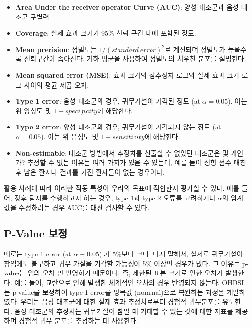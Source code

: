 \documentclass[10.5pt]{book}
\providecommand{\tightlist}{%
  \setlength{\itemsep}{0pt}\setlength{\parskip}{0pt}}
\theoremstyle{definition}
\theoremstyle{definition}
\theoremstyle{definition}
\theoremstyle{remark}
\begin{document}
\begin{itemize}
\tightlist
\item
  \textbf{Area Under the receiver operator Curve (AUC)}: 양성 대조군과
  음성 대조군 구별력.
\item
  \textbf{Coverage}: 실제 효과 크기가 95\% 신뢰 구간 내에 포함된 정도.
\item
  \textbf{Mean precision}: 정밀도는 \(1 / (standard \ error) ^ 2\)로
  계산되며 정밀도가 높을수록 신뢰구간이 좁아진다. 기하 평균을 사용하여
  정밀도의 치우친 분포를 설명한다.
\item
  \textbf{Mean squared error (MSE)}: 효과 크기의 점추정치 로그와 실제
  효과 크기 로그 사이의 평균 제곱 오차.
\item
  \textbf{Type 1 error}: 음성 대조군의 경우, 귀무가설이 기각된 정도 (at
  \(\alpha = 0.05\)). 이는 위 양성도 및 \(1 - specificity\)에 해당한다.
\item
  \textbf{Type 2 error}: 양성 대조군의 경우, 귀무가설이 기각되지 않는
  정도 (at \(\alpha = 0.05\)). 이는 위 음성도 및 \(1 - sensitivity\)에
  해당한다.
\item
  \textbf{Non-estimable}: 대조군 방법에서 추정치를 산출할 수 없었던
  대조군은 몇 개인가? 추정할 수 없는 이유는 여러 가지가 있을 수 있는데,
  예를 들어 성향 점수 매칭 후 남은 환자나 결과를 가진 환자들이 없는
  경우이다.
\end{itemize}

활용 사례에 따라 이러한 작동 특성이 우리의 목표에 적합한지 평가할 수
있다. 예를 들어, 징후 탐지를 수행하고자 하는 경우, type 1과 type 2
오류를 고려하거나 \(\alpha\)의 임계 값을 수정하려는 경우 AUC를 대신
검사할 수 있다.

\subsection{P-Value 보정}\label{p-value-}

 

때로는 type 1 error (at \(\alpha = 0.05\)) 가 5\%보다 크다. 다시 말해서,
실제로 귀무가설이 참임에도 불구하고 귀무 가설을 기각할 가능성이 5\%
이상인 경우가 많다. 그 이유는 p-value는 임의 오차 만 반영하기 때문이다.
즉, 제한된 표본 크기로 인한 오차가 발생한다. 예를 들어, 교란으로 인해
발생한 체계적인 오차의 경우 반영되지 않는다. OHDSI는 p-value를 보정하여
type 1 error를 명목값 (nominal)으로 복원하는 과정을 개발하였다.
\citep{schuemie_2014} 우리는 음성 대조군에 대한 실제 효과 추정치로부터
경험적 귀무분포를 유도한다. 음성 대조군의 추정치는 귀무가설이 참일 때
기대할 수 있는 것에 대한 지표를 제공하며 경험적 귀무 분포를 추정하는 데
사용한다.
\end{document}
